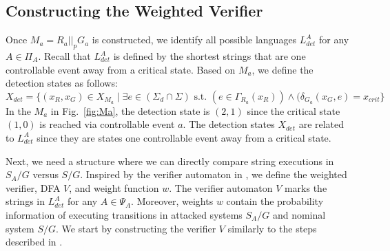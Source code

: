 \subsection{Constructing the Weighted Verifier}
Once $M_a = R_a||_p G_a$ is constructed, we identify all possible languages $L_{det}^A$ for any $A\in \Pi_A$.
Recall that $L_{det}^A$ is defined by the shortest strings that are one controllable event away from a critical state.
Based on $M_a$, we define the detection states as follows:
\begin{equation}
X_{det} = \{(x_R,x_G)\in X_{M_a}\mid \exists e\in (\Sigma_d\cap\Sigma)\text{ s.t. } (e \in \Gamma_{R_a}(x_R))\wedge (\delta_{G_a}(x_{G},e)=x_{crit}\}
\end{equation}
In the $M_a$ in Fig.~\ref{fig:Ma}, the detection state is $(2,1)$ since the critical state $(1,0)$ is reached via controllable event $a$. 
The detection states $X_{det}$ are related to $L_{det}^A$ since they are states one controllable event away from a critical state.





Next, we need a structure where we can directly compare string executions in $S_A/G$ versus $S/G$.
Inspired by the verifier automaton in \citep{yoo2002polynomial}, we define the weighted verifier, DFA $V$, and weight function $w$.
The verifier automaton $V$ marks the strings in $L^A_{det}$ for any $A\in \Psi_A$.
Moreover, weights $w$ contain the probability information of executing transitions in attacked systems $S_A/G$ and nominal system $S/G$.
We start by constructing the verifier $V$ similarly to the steps described in \citep{meira-goes:2020towards}. 

